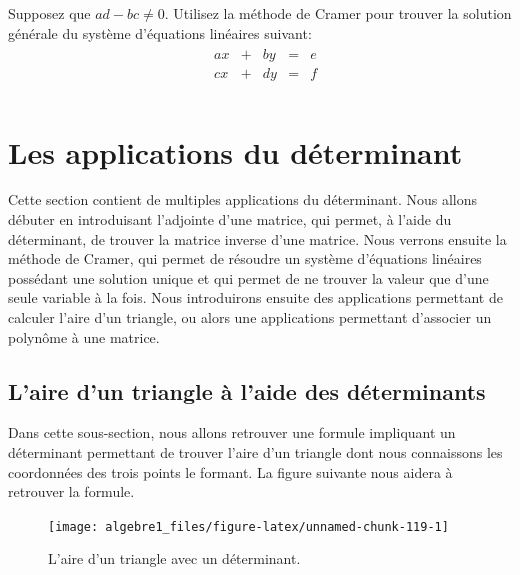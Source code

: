 \documentclass[]{book}
\theoremstyle{definition}
\theoremstyle{definition}
\theoremstyle{definition}
\theoremstyle{remark}
\let\BeginKnitrBlock\begin \let\EndKnitrBlock\end
\begin{document}
\BeginKnitrBlock{example}
\protect\hypertarget{exm:unnamed-chunk-118}{}{\label{exm:unnamed-chunk-118} }Supposez que \(ad-bc\neq 0\). Utilisez la méthode de Cramer pour trouver la solution générale du système d'équations linéaires suivant:
\begin{align*}
\begin{array}{cccccc}
&ax&+&by&=&e\\
&cx&+&dy&=&f\\
\end{array}
\end{align*}
\EndKnitrBlock{example}

\hypertarget{les-applications-du-duxe9terminant}{%
\section{Les applications du déterminant}\label{les-applications-du-duxe9terminant}}

Cette section contient de multiples applications du déterminant. Nous allons débuter en introduisant l'adjointe d'une matrice, qui permet, à l'aide du déterminant, de trouver la matrice inverse d'une matrice. Nous verrons ensuite la méthode de Cramer, qui permet de résoudre un système d'équations linéaires possédant une solution unique et qui permet de ne trouver la valeur que d'une seule variable à la fois. Nous introduirons ensuite des applications permettant de calculer l'aire d'un triangle, ou alors une applications permettant d'associer un polynôme à une matrice.

\hypertarget{laire-dun-triangle-uxe0-laide-des-duxe9terminants}{%
\subsection{L'aire d'un triangle à l'aide des déterminants}\label{laire-dun-triangle-uxe0-laide-des-duxe9terminants}}

Dans cette sous-section, nous allons retrouver une formule impliquant un déterminant permettant de trouver l'aire d'un triangle dont nous connaissons les coordonnées des trois points le formant. La figure suivante nous aidera à retrouver la formule.

\begin{figure}

{\centering \texttt{[image: algebre1\_files/figure-latex/unnamed-chunk-119-1]} 

}

\caption{L'aire d'un triangle avec un déterminant.}\label{fig:unnamed-chunk-119}
\end{figure}
\end{document}
